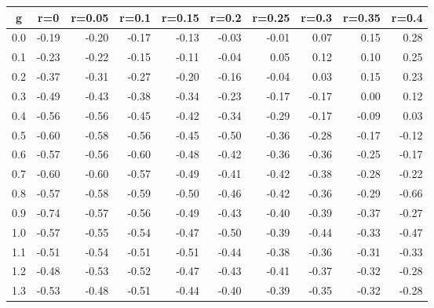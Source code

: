 %
\begin{table}[!tbp]
 \begin{center}
 \begin{tabular}{rrrrrrrrrr}\hline\hline
\multicolumn{1}{c}{g}&\multicolumn{1}{c}{r=0}&\multicolumn{1}{c}{r=0.05}&\multicolumn{1}{c}{r=0.1}&\multicolumn{1}{c}{r=0.15}&\multicolumn{1}{c}{r=0.2}&\multicolumn{1}{c}{r=0.25}&\multicolumn{1}{c}{r=0.3}&\multicolumn{1}{c}{r=0.35}&\multicolumn{1}{c}{r=0.4}\tabularnewline
\hline
0.0&-0.19&-0.20&-0.17&-0.13&-0.03&-0.01& 0.07& 0.15& 0.28\tabularnewline
0.1&-0.23&-0.22&-0.15&-0.11&-0.04& 0.05& 0.12& 0.10& 0.25\tabularnewline
0.2&-0.37&-0.31&-0.27&-0.20&-0.16&-0.04& 0.03& 0.15& 0.23\tabularnewline
0.3&-0.49&-0.43&-0.38&-0.34&-0.23&-0.17&-0.17& 0.00& 0.12\tabularnewline
0.4&-0.56&-0.56&-0.45&-0.42&-0.34&-0.29&-0.17&-0.09& 0.03\tabularnewline
0.5&-0.60&-0.58&-0.56&-0.45&-0.50&-0.36&-0.28&-0.17&-0.12\tabularnewline
0.6&-0.57&-0.56&-0.60&-0.48&-0.42&-0.36&-0.36&-0.25&-0.17\tabularnewline
0.7&-0.60&-0.60&-0.57&-0.49&-0.41&-0.42&-0.38&-0.28&-0.22\tabularnewline
0.8&-0.57&-0.58&-0.59&-0.50&-0.46&-0.42&-0.36&-0.29&-0.66\tabularnewline
0.9&-0.74&-0.57&-0.56&-0.49&-0.43&-0.40&-0.39&-0.37&-0.27\tabularnewline
1.0&-0.57&-0.55&-0.54&-0.47&-0.50&-0.39&-0.44&-0.33&-0.47\tabularnewline
1.1&-0.51&-0.54&-0.51&-0.51&-0.44&-0.38&-0.36&-0.31&-0.33\tabularnewline
1.2&-0.48&-0.53&-0.52&-0.47&-0.43&-0.41&-0.37&-0.32&-0.28\tabularnewline
1.3&-0.53&-0.48&-0.51&-0.44&-0.40&-0.39&-0.35&-0.32&-0.28\tabularnewline
\hline
\end{tabular}

\end{center}

\end{table}

